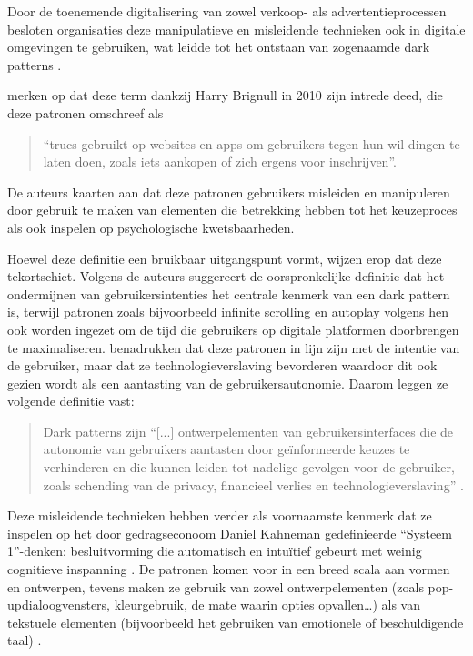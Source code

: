 \vspace{1em}

Door de toenemende digitalisering van zowel verkoop- als advertentieprocessen besloten organisaties deze manipulatieve en misleidende technieken ook in digitale omgevingen te gebruiken, wat leidde tot het ontstaan van zogenaamde dark patterns \autocite{Kollmer2022}.

\vspace{1em}

\textcite{Kollmer2022} merken op dat deze term dankzij Harry Brignull in 2010 zijn intrede deed, die deze patronen omschreef als 

\begin{quote}
    “trucs gebruikt op websites en apps om gebruikers tegen hun wil dingen te laten doen, zoals iets aankopen of zich ergens voor inschrijven”.
\end{quote}

De auteurs kaarten aan dat deze patronen gebruikers misleiden en manipuleren door gebruik te maken van elementen die betrekking hebben tot het keuzeproces als ook inspelen op psychologische kwetsbaarheden. 

\vspace{1em}

Hoewel deze definitie een bruikbaar uitgangspunt vormt, wijzen \textcite{Kollmer2022} erop dat deze tekortschiet. Volgens de auteurs suggereert de oorspronkelijke definitie dat het ondermijnen van gebruikersintenties het centrale kenmerk van een dark pattern is, terwijl patronen zoals bijvoorbeeld infinite scrolling en autoplay volgens hen ook worden ingezet om de tijd die gebruikers op digitale platformen doorbrengen te maximaliseren. \textcite{Kollmer2022} benadrukken dat deze patronen in lijn zijn met de intentie van de gebruiker, maar dat ze technologieverslaving bevorderen waardoor dit ook gezien wordt als een aantasting van de gebruikersautonomie. Daarom leggen ze volgende definitie vast:

\begin{quote}
    Dark patterns zijn “[...] ontwerpelementen van gebruikersinterfaces die de autonomie van gebruikers aantasten door geïnformeerde keuzes te verhinderen en die kunnen leiden tot nadelige gevolgen voor de gebruiker, zoals schending van de privacy, financieel verlies en technologieverslaving” \autocite{Kollmer2022}.
\end{quote}

Deze misleidende technieken hebben verder als voornaamste kenmerk dat ze inspelen op het door gedragseconoom Daniel Kahneman gedefinieerde “Systeem 1”-denken: besluitvorming die automatisch en intuïtief gebeurt met weinig cognitieve inspanning \autocite{OECD2022}. De patronen komen voor in een breed scala aan vormen en ontwerpen, tevens maken ze gebruik van zowel ontwerpelementen (zoals pop-updialoogvensters, kleurgebruik, de mate waarin opties opvallen…) als van tekstuele elementen (bijvoorbeeld het gebruiken van emotionele of beschuldigende taal) \autocite{OECD2022}.

